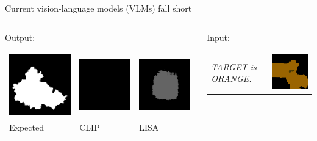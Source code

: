 \documentclass[14pt,aspectratio=169]{beamer}
\begin{document}
\begin{frame}{Current vision-language models (VLMs) fall short}
\begin{columns}
\begin{column}{0.48\textwidth}
\medskip
Output: \\
\begin{tabular}{ l l l @{}}
\includegraphics[width=.25\textwidth]{compgeo/GL006_046_oracle_output_reference.png}
&
\includegraphics[width=.25\textwidth]{compgeo/GL006_046_oracle_output_clip.png}
&
\includegraphics[width=.25\textwidth]{compgeo/GL006_046_oracle_output_lisa.jpg}
\\
Expected & CLIP & LISA
\end{tabular}
\end{column}
\pause
\begin{column}{0.48\textwidth}
Input: \\
\smallskip
\begin{tabular}{ p{} l @{}}
\textit{TARGET is ORANGE.} &
\includegraphics[align=t,width=.25\textwidth]{compgeo/GL024_425_color_input.png}
\end{tabular}


\end{column}
\end{columns}
\end{frame}
\end{document}
